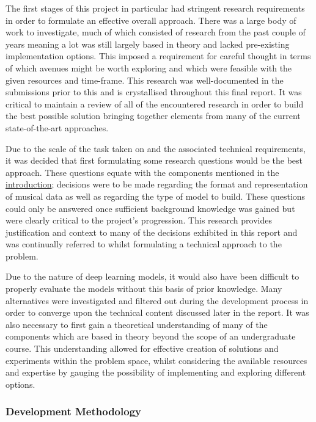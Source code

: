 \documentclass[12pt,]{article}
\begin{document}
The first stages of this project in particular had stringent research
requirements in order to formulate an effective overall approach. There
was a large body of work to investigate, much of which consisted of
research from the past couple of years meaning a lot was still largely
based in theory and lacked pre-existing implementation options. This
imposed a requirement for careful thought in terms of which avenues
might be worth exploring and which were feasible with the given
resources and time-frame. This research was well-documented in the
submissions prior to this and is crystallised throughout this final
report. It was critical to maintain a review of all of the encountered
research in order to build the best possible solution bringing together
elements from many of the current state-of-the-art approaches.

Due to the scale of the task taken on and the associated technical
requirements, it was decided that first formulating some research
questions would be the best approach. These questions equate with the
components mentioned in the
\protect\hyperlink{introduction}{introduction}; decisions were to be
made regarding the format and representation of musical data as well as
regarding the type of model to build. These questions could only be
answered once sufficient background knowledge was gained but were
clearly critical to the project's progression. This research provides
justification and context to many of the decisions exhibited in this
report and was continually referred to whilst formulating a technical
approach to the problem.

Due to the nature of deep learning models, it would also have been
difficult to properly evaluate the models without this basis of prior
knowledge. Many alternatives were investigated and filtered out during
the development process in order to converge upon the technical content
discussed later in the report. It was also necessary to first gain a
theoretical understanding of many of the components which are based in
theory beyond the scope of an undergraduate course. This understanding
allowed for effective creation of solutions and experiments within the
problem space, whilst considering the available resources and expertise
by gauging the possibility of implementing and exploring different
options.

\hypertarget{development-methodology}{%
\subsubsection{Development Methodology}\label{development-methodology}}
\end{document}
